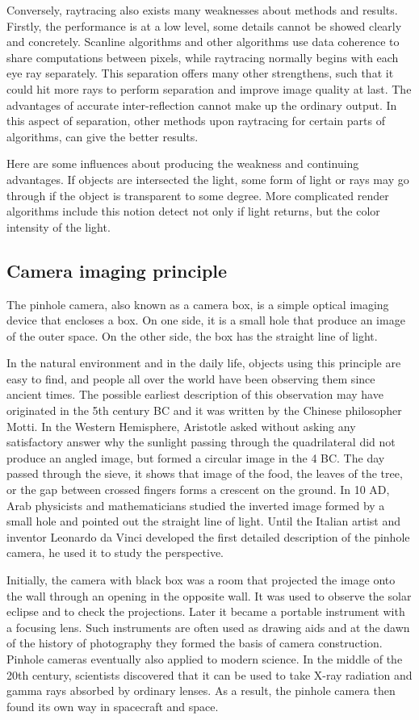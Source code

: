\documentclass[11pt]{article}
\begin{document}
Conversely, raytracing also exists many weaknesses about methods and results. Firstly, the performance is at a low level, some details cannot be showed clearly and concretely. Scanline algorithms and other algorithms use data coherence to share computations between pixels, while raytracing normally begins with each eye ray separately. This separation offers many other strengthens, such that it could hit more rays to perform separation and improve image quality at last. The advantages of accurate inter-reflection cannot make up the ordinary output. In this aspect of separation, other methods upon raytracing for certain parts of algorithms, can give the better results.

Here are some influences about producing the weakness and continuing advantages. If objects are intersected the light, some form of light or rays may go through if the object is transparent to some degree. More complicated render algorithms include this notion detect not only if light returns, but the color intensity of the light.

\subsection{Camera imaging principle}
The pinhole camera, also known as a camera box, is a simple optical imaging device that encloses a box. On one side, it is a small hole that produce an image of the outer space. On the other side, the box has the straight line of light.

In the natural environment and in the daily life, objects using this principle are easy to find, and people all over the world have been observing them since ancient times. The possible earliest description of this observation may have originated in the 5th century BC and it was written by the Chinese philosopher Motti. In the Western Hemisphere, Aristotle asked without asking any satisfactory answer why the sunlight passing through the quadrilateral did not produce an angled image, but formed a circular image in the 4 BC. The day passed through the sieve, it shows that image of the food, the leaves of the tree, or the gap between crossed fingers forms a crescent on the ground. In 10 AD, Arab physicists and mathematicians studied the inverted image formed by a small hole and pointed out the straight line of light. Until the Italian artist and inventor Leonardo da Vinci developed the first detailed description of the pinhole camera, he used it to study the perspective.

Initially, the camera with black box was a room that projected the image onto the wall through an opening in the opposite wall. It was used to observe the solar eclipse and to check the projections. Later it became a portable instrument with a focusing lens. Such instruments are often used as drawing aids and at the dawn of the history of photography they formed the basis of camera construction. Pinhole cameras eventually also applied to modern science. In the middle of the 20th century, scientists discovered that it can be used to take X-ray radiation and gamma rays absorbed by ordinary lenses. As a result, the pinhole camera then found its own way in spacecraft and space.
\end{document}
